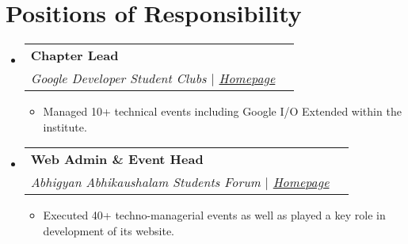 \documentclass[letterpaper,11pt]{article}
\makeatletter
\newcommand{\resumeItem}[1]{
  \item\small{
    {#1 \vspace{-2pt}}
  }
}
\newcommand{\resumeSubheading}[4]{
  \vspace{-2pt}\item
    \begin{tabular*}{1.0\textwidth}[t]{l@{\extracolsep{\fill}}r}
      \textbf{#1} & \textbf{\small #2} \\
      \textit{\small#3} & \textit{\small #4} \\
    \end{tabular*}\vspace{-7pt}
}
\newcommand{\resumeSubHeadingListStart}{\begin{itemize}[leftmargin=0.0in, label={}]}
\newcommand{\resumeSubHeadingListEnd}{\end{itemize}}
\newcommand{\resumeItemListStart}{\begin{itemize}}
\newcommand{\resumeItemListEnd}{\end{itemize}\vspace{-5pt}}
\makeatother
\begin{document}
    
\section{Positions of Responsibility}
    \resumeSubHeadingListStart
        \resumeSubheading
          {Chapter Lead}{}
          {Google Developer Student Clubs $|$ \textcolor{OliveGreen}{\href{https://gdsc.community.dev/atal-bihari-vajpayee-indian-institute-of-information-technology-and-management-abv-iiitm-gwalior}{Homepage}}}{}
          \resumeItemListStart
            \resumeItem{Managed 10+ technical events including Google I/O Extended within the institute.}
          \resumeItemListEnd 

        \resumeSubheading
          {Web Admin \& Event Head}{}
          {Abhigyan Abhikaushalam Students Forum $|$ \textcolor{OliveGreen}{\href{https://www.aasf.in/}{Homepage}}}{}
          \resumeItemListStart
            \resumeItem{Executed 40+ techno-managerial events as well as played a key role in development of its website.}
          \resumeItemListEnd         
    \resumeSubHeadingListEnd
\end{document}
